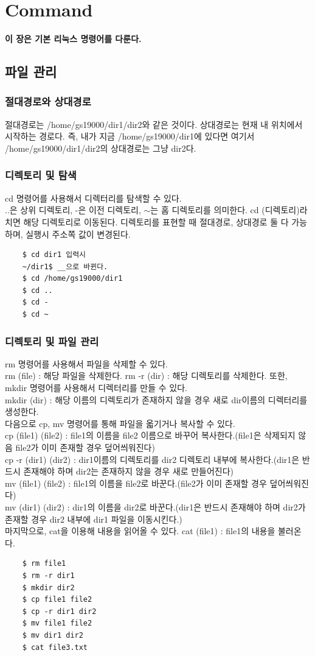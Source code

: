 
\graphicspath{{./chap3/images/}} 
\chapter{Command}
\textbf{이 장은 기본 리눅스 명령어를 다룬다.}
\section{파일 관리}
\subsection{절대경로와 상대경로}
절대경로는 /home/gs19000/dir1/dir2와 같은 것이다. 상대경로는 현재 내 위치에서 시작하는 경로다. 즉, 내가 지금 /home/gs19000/dir1에 있다면 여기서 /home/gs19000/dir1/dir2의 상대경로는 그냥 dir2다.
\subsection{디렉토리 및 탐색}
cd 명령어를 사용해서 디렉터리를 탐색할 수 있다. \\ ..은 상위 디렉토리, -은 이전 디렉토리, $\sim$는 홈 디렉토리를 의미한다.
cd (디렉토리)라 치면 해당 디렉토리로 이동된다. 디렉토리를 표현할 때 절대경로, 상대경로 둘 다 가능하며, 실행시 주소쪽 값이 변경된다.
\begin{lstlisting}
    $ cd dir1 입력시
    ~/dir1$ __으로 바뀐다.
    $ cd /home/gs19000/dir1 
    $ cd ..
    $ cd -
    $ cd ~
\end{lstlisting}
\subsection{디렉토리 및 파일 관리}
rm 명령어를 사용해서 파일을 삭제할 수 있다.\\
rm (file) : 해당 파일을 삭제한다. rm -r (dir) : 해당 디렉토리를 삭제한다.
또한, mkdir 명령어를 사용해서 디렉터리를 만들 수 있다.\\
mkdir (dir) : 해당 이름의 디렉토리가 존재하지 않을 경우 새로 dir이름의 디렉터리를 생성한다.\\


다음으로 cp, mv 명령어를 통해 파일을 옯기거나 복사할 수 있다.\\
cp (file1) (file2) : file1의 이름을 file2 이름으로 바꾸어 복사한다.(file1은 삭제되지 않음 file2가 이미 존재할 경우 덮어씌워진다)\\
cp -r (dir1) (dir2) : dir1이름의 디렉토리를 dir2 디렉토리 내부에 복사한다.(dir1은 반드시 존재해야 하며 dir2는 존재하지 않을 경우 새로 만들어진다)\\
mv (file1) (file2) : file1의 이름을 file2로 바꾼다.(file2가 이미 존재할 경우 덮어씌워진다)\\
mv (dir1) (dir2) : dir1의 이름을 dir2로 바꾼다.(dir1은 반드시 존재해야 하며 dir2가 존재할 경우 dir2 내부에 dir1 파일을 이동시킨다.)\\
마지막으로, cat을 이용해 내용을 읽어올 수 있다. cat (file1) : file1의 내용을 불러온다.
    \begin{lstlisting}
    $ rm file1
    $ rm -r dir1
    $ mkdir dir2
    $ cp file1 file2
    $ cp -r dir1 dir2
    $ mv file1 file2
    $ mv dir1 dir2
    $ cat file3.txt
    \end{lstlisting}
